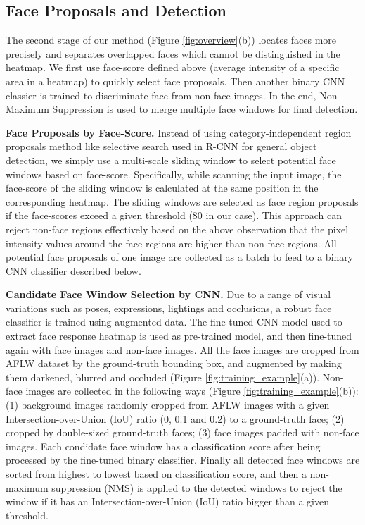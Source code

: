 \documentclass[10pt,twocolumn,letterpaper]{article}
\begin{document}
\subsection{Face Proposals and Detection}

The second stage of our method (Figure \ref{fig:overview}(b)) locates faces more precisely and separates overlapped faces which cannot be distinguished in the heatmap. We first use face-score defined above (average intensity of a specific area in a heatmap) to quickly select face proposals. Then another binary CNN classier is trained to discriminate face from non-face images. In the end, Non-Maximum Suppression is used to merge multiple face windows for final detection.

{\bf Face Proposals by Face-Score.} Instead of using category-independent region proposals method like selective search \cite{uijlings2013selective} used in R-CNN \cite{girshick2014rich} for general object detection, we simply use a multi-scale sliding window to select potential face windows based on face-score. Specifically, while scanning the input image, the face-score of the sliding window is calculated at the same position in the corresponding heatmap. The sliding windows are selected as face region proposals if the face-scores exceed a given threshold (80 in our case). This approach can reject non-face regions effectively based on the above observation that the pixel intensity values around the face regions are higher than non-face regions. All potential face proposals of one image are collected as a batch to feed to a binary CNN classifier described below.

{\bf Candidate Face Window Selection by CNN.} Due to a range of visual variations such as poses, expressions, lightings and occlusions, a robust face classifier is trained using augmented data. The fine-tuned CNN model used to extract face response heatmap is used as pre-trained model, and then fine-tuned again with face images and non-face images. All the face images are cropped from AFLW dataset \cite{kostinger2011annotated} by the ground-truth bounding box, and augmented by making them darkened, blurred and occluded (Figure \ref{fig:training_example}(a)). Non-face images are collected in the following ways (Figure \ref{fig:training_example}(b)): (1) background images randomly cropped from AFLW images with a given Intersection-over-Union (IoU) ratio (0, 0.1 and 0.2) to a ground-truth face; (2) cropped by double-sized ground-truth faces; (3) face images padded with non-face images. Each condidate face window has a classification score after being processed by the fine-tuned binary classifier. Finally all detected face windows are sorted from highest to lowest based on classification score, and then a non-maximum suppression (NMS) is applied to the detected windows to reject the window if it has an Intersection-over-Union (IoU) ratio bigger than a given threshold.
\end{document}
